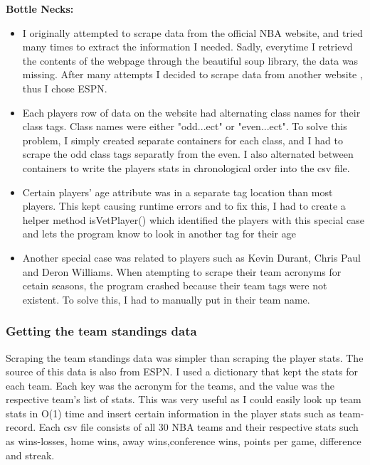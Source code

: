 \documentclass[11pt]{article}
\begin{document}
\textbf{Bottle Necks:} \newline

\begin{itemize}
\item
  I originally attempted to scrape data from the official NBA website,
  and tried many times to extract the information I needed. Sadly,
  everytime I retrievd the contents of the webpage through the beautiful
  soup library, the data was missing. After many attempts I decided to
  scrape data from another website , thus I chose ESPN.
\item
  Each players row of data on the website had alternating class names
  for their class tags. Class names were either "odd...ect" or
  "even...ect". To solve this problem, I simply created separate
  containers for each class, and I had to scrape the odd class tags
  separatly from the even. I also alternated between containers to write
  the players stats in chronological order into the csv file.
\item
  Certain players' age attribute was in a separate tag location than
  most players. This kept causing runtime errors and to fix this, I had
  to create a helper method isVetPlayer() which identified the players
  with this special case and lets the program know to look in another
  tag for their age
\item
  Another special case was related to players such as Kevin Durant,
  Chris Paul and Deron Williams. When atempting to scrape their team
  acronyms for cetain seasons, the program crashed because their team
  tags were not existent. To solve this, I had to manually put in their
  team name.
\end{itemize}

    \subsubsection{Getting the team standings
data}\label{getting-the-team-standings-data}

Scraping the team standings data was simpler than scraping the player
stats. The source of this data is also from ESPN. I used a dictionary
that kept the stats for each team. Each key was the acronym for the
teams, and the value was the respective team's list of stats. This was
very useful as I could easily look up team stats in O(1) time and insert
certain information in the player stats such as team-record. Each csv
file consists of all 30 NBA teams and their respective stats such as
wins-losses, home wins, away wins,conference wins, points per game,
difference and streak. \newline
\end{document}
